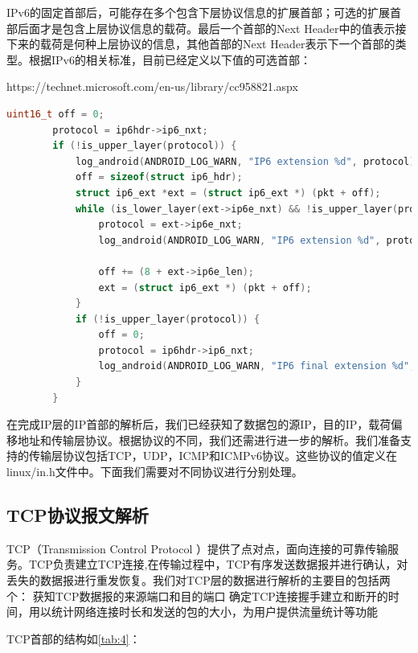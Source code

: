 \documentclass[format=final, language=chinese, degree=bachelor]{hustthesis}
\begin{document}
IPv6的固定首部后，可能存在多个包含下层协议信息的扩展首部；可选的扩展首部后面才是包含上层协议信息的载荷。最后一个首部的Next Header中的值表示接下来的载荷是何种上层协议的信息，其他首部的Next Header表示下一个首部的类型。根据IPv6的相关标准，目前已经定义以下值的可选首部：



https://technet.microsoft.com/en-us/library/cc958821.aspx


\begin{lstlisting}[language=c]
        uint16_t off = 0;
        protocol = ip6hdr->ip6_nxt;
        if (!is_upper_layer(protocol)) {
            log_android(ANDROID_LOG_WARN, "IP6 extension %d", protocol);
            off = sizeof(struct ip6_hdr);
            struct ip6_ext *ext = (struct ip6_ext *) (pkt + off);
            while (is_lower_layer(ext->ip6e_nxt) && !is_upper_layer(protocol)) {
                protocol = ext->ip6e_nxt;
                log_android(ANDROID_LOG_WARN, "IP6 extension %d", protocol);

                off += (8 + ext->ip6e_len);
                ext = (struct ip6_ext *) (pkt + off);
            }
            if (!is_upper_layer(protocol)) {
                off = 0;
                protocol = ip6hdr->ip6_nxt;
                log_android(ANDROID_LOG_WARN, "IP6 final extension %d", protocol);
            }
        }
\end{lstlisting}

在完成IP层的IP首部的解析后，我们已经获知了数据包的源IP，目的IP，载荷偏移地址和传输层协议。根据协议的不同，我们还需进行进一步的解析。我们准备支持的传输层协议包括TCP，UDP，ICMP和ICMPv6协议。这些协议的值定义在linux/in.h文件中。下面我们需要对不同协议进行分别处理。

\subsection{TCP协议报文解析}

TCP（Transmission Control Protocol ）提供了点对点，面向连接的可靠传输服务。TCP负责建立TCP连接,在传输过程中，TCP有序发送数据报并进行确认，对丢失的数据报进行重发恢复。我们对TCP层的数据进行解析的主要目的包括两个：
    获知TCP数据报的来源端口和目的端口
    确定TCP连接握手建立和断开的时间，用以统计网络连接时长和发送的包的大小，为用户提供流量统计等功能

TCP首部的结构如\autoref{tab:4}：
\end{document}
